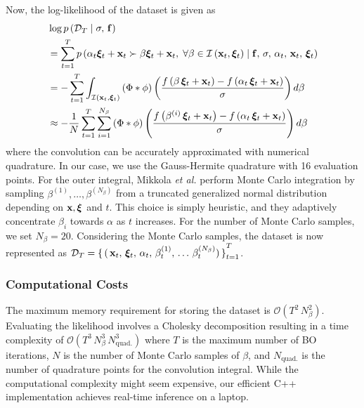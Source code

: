 Now, the log-likelihood of the dataset is given as
{\small
\begin{align}
  &\log p\left(\mathcal{D}_T \mid \sigma,\, \mathbf{f} \right)  \nonumber\\
  &= \sum_{t=1}^{T} p\left(\alpha_t \bm{\xi}_t + \mathbf{x}_t \succ \beta \bm{\xi}_t + \mathbf{x}_t,\; \forall \beta \in \mathcal{I}\left(\mathbf{x}_t, \bm{\xi}_t\right) \mid \mathbf{f},\, \sigma,\, \alpha_t,\, \mathbf{x}_t,\, \bm{\xi}_t\right) \nonumber\\
  &= -\sum_{t=1}^{T} \int_{\mathcal{I}\left(\mathbf{x}_{t}, \bm{\xi}_{t}\right)} \left(\Phi * \phi \right) \left( \frac{ f\left(\beta \, \bm{\xi}_{t} + \mathbf{x}_{t} \right) - f\left(\alpha_{t} \, \bm{\xi}_{t} + \mathbf{x}_{t} \right) }{\sigma} \right) d\beta \nonumber\\
  &\approx -\frac{1}{N}  \sum_{t=1}^{T} \sum_{i=1}^{N_{\beta}} \left(\Phi * \phi \right) \left( \frac{ f\left(\beta^{(i)} \, \bm{\xi}_{t} + \mathbf{x}_{t} \right) - f\left(\alpha_{t} \, \bm{\xi}_{t} + \mathbf{x}_{t} \right) }{\sigma} \right) d\beta
\end{align}
}%
{\noindent}where the convolution can be accurately approximated with numerical quadrature.
In our case, we use the Gauss-Hermite quadrature with 16 evaluation points.
For the outer integral, Mikkola \textit{et al.} perform Monte Carlo integration by sampling \(\beta^{(1)}, \ldots, \beta^{(N_{\beta})} \) from a truncated generalized normal distribution depending on \(\mathbf{x}, \bm{\xi}\) and \(t\).
This choice is simply heuristic, and they adaptively concentrate \(\beta_i\) towards \(\alpha\) as \(t\) increases.
For the number of Monte Carlo samples, we set \(N_{\beta}=20\).
Considering the Monte Carlo samples, the dataset is now represented as \(\mathcal{D}_{T} = {\{\,(\,\mathbf{x}_{t},\, \bm{\xi}_{t},\, \alpha_{t},\, \beta^{(1)}_{t},\, \ldots\, \beta^{(N_{\beta})}_{t})\,\}}_{t=1}^{T}\).

\subsubsection{Computational Costs}
The maximum memory requirement for storing the dataset is \(\mathcal{O}\left( T^2 \, N_{\beta}^2  \right)\).
Evaluating the likelihood involves a Cholesky decomposition resulting in a time complexity of \(\mathcal{O}\left( T^3 \, N_{\beta}^3 \, N_{\text{quad.}}^3  \right)\) where \(T\) is the maximum number of BO iterations, \(N\) is the number of Monte Carlo samples of \(\beta\), and \(N_{\text{quad.}}\) is the number of quadrature points for the convolution integral.
While the computational complexity might seem expensive, our efficient C++ implementation achieves real-time inference on a laptop.


